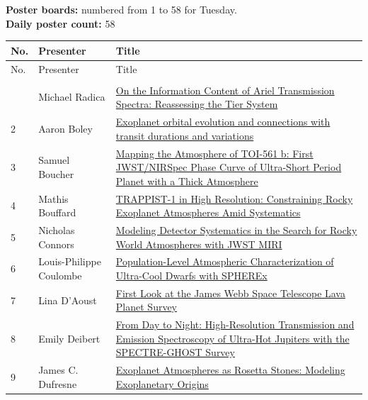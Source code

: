 \textbf{Poster boards:} numbered from 1 to 58 for Tuesday.\\
\textbf{Daily poster count:} 58

{\small
{}
\sloppy
\setlength{\emergencystretch}{1em}
\begin{longtable}{@{}>{\TableRaggedRight\arraybackslash\hspace{0pt}}p{} >{\TableRaggedRight\arraybackslash\hspace{0pt}}p{} >{\TableRaggedRight\arraybackslash\hspace{0pt}}p{}@{}}
\toprule
No. & Presenter & Title \\
\midrule
\endfirsthead
\toprule
No. & Presenter & Title \\
\midrule
\endhead
\addlinespace[0.2em]
\multicolumn{3}{@{}l}{\sffamily\bfseries\color{cascateal} Exoplanets} \\
\addlinespace[0.15em]
1 & Michael Radica & \hyperlink{poster-abstract-talk-1}{On the Information Content of Ariel Transmission Spectra: Reassessing the Tier System} \\
2 & Aaron Boley & \hyperlink{poster-abstract-talk-303}{Exoplanet orbital evolution and connections with transit durations and variations} \\
3 & Samuel Boucher & \hyperlink{poster-abstract-talk-237}{Mapping the Atmosphere of TOI-561 b: First JWST/NIRSpec Phase Curve of Ultra-Short Period Planet with a Thick Atmosphere} \\
4 & Mathis Bouffard & \hyperlink{poster-abstract-talk-53}{TRAPPIST-1 in High Resolution: Constraining Rocky Exoplanet Atmospheres Amid Systematics} \\
5 & Nicholas Connors & \hyperlink{poster-abstract-talk-312}{Modeling Detector Systematics in the Search for Rocky World Atmospheres with JWST MIRI} \\
6 & Louis-Philippe Coulombe & \hyperlink{poster-abstract-talk-56}{Population-Level Atmospheric Characterization of Ultra-Cool Dwarfs with SPHEREx} \\
7 & Lina D'Aoust & \hyperlink{poster-abstract-talk-261}{First Look at the James Webb Space Telescope Lava Planet Survey} \\
8 & Emily Deibert & \hyperlink{poster-abstract-talk-32}{From Day to Night: High-Resolution Transmission and Emission Spectroscopy of Ultra-Hot Jupiters with the SPECTRE-GHOST Survey} \\
9 & James C. Dufresne & \hyperlink{poster-abstract-talk-71}{Exoplanet Atmospheres as Rosetta Stones: Modeling Exoplanetary Origins} \\

\end{longtable}}
